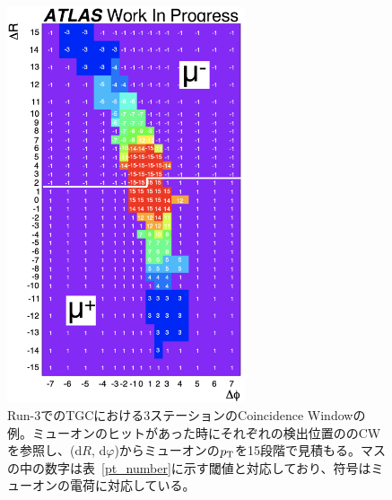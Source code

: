 \begin{figure}[tb]
  \centering
  \includegraphics[clip, width=7cm]{fig/3/Run3CW.pdf}
  \caption{Run-3でのTGCにおける3ステーションのCoincidence Windowの例\cite{article:shiomi-mron}。ミューオンのヒットがあった時にそれぞれの検出位置ののCWを参照し、(d$R$, d$φ$)からミューオンの$p_{\rm{T}}$を15段階で見積もる。マスの中の数字は表~\ref{pt_number}に示す閾値と対応しており、符号はミューオンの電荷に対応している。}
  \label{fig:CW}
\end{figure}

